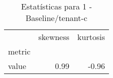 \begin{table}[htbp]
\caption{Estatísticas para 1 - Baseline/tenant-c}
\label{tab:1_-_baseline_tenant-c_skewkurt}
\begin{tabular}{lrr}
\toprule
 & skewness & kurtosis \\
metric &  &  \\
\midrule
value & 0.99 & -0.96 \\
\bottomrule
\end{tabular}
\end{table}
